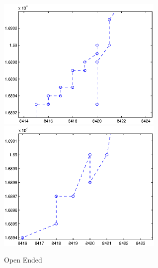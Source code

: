 \documentclass{sig-alternate}
\begin{document}
\begin{figure}
 \includegraphics[height=2.5in]{open_self_intersect.eps}
 \includegraphics[height=2.5in]{open_self_intersect_resolve.eps}
 \caption{Open Ended}

 \label{fig:Open ended}
\end{figure}


 
 
\end{document}
